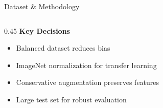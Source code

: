\documentclass[aspectratio=169]{beamer}
\begin{document}
\begin{frame}{Dataset \& Methodology}
\begin{columns}[T]
\begin{column}{0.45\textwidth}
            \vspace{-0.1cm}
            \textbf{Key Decisions}
            \begin{itemize}
                \item Balanced dataset reduces bias
                \item ImageNet normalization for transfer learning
                \item Conservative augmentation preserves features
                \item Large test set for robust evaluation
            \end{itemize}
        \end{column}
    \end{columns}
\end{frame}

\end{document}
